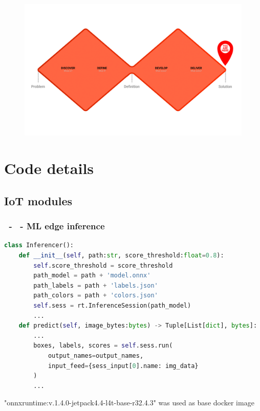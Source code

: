 \documentclass{beamer}
\makeatletter
\newcommand*{\currentname}{\@currentlabelname}
\makeatother
\begin{document}
\begin{frame}
\frametitle{\secname}
\begin{figure}
\includegraphics[width=0.9\linewidth]{Imagens/V1 D.jpg}
\end{figure}
\end{frame}


\section{Code details}
\begin{frame}
\centering \Huge {\currentname}
\end{frame}


\subsection{IoT modules}

\begin{frame}[fragile]
\frametitle{\secname\ - \subsecname\ - ML edge inference}
    \begin{lstlisting}[language=Python]
class Inferencer():
    def __init__(self, path:str, score_threshold:float=0.8):
        self.score_threshold = score_threshold
        path_model = path + 'model.onnx'
        path_labels = path + 'labels.json'
        path_colors = path + 'colors.json'
        self.sess = rt.InferenceSession(path_model)
        ...
    def predict(self, image_bytes:bytes) -> Tuple[List[dict], bytes]:
        ...
        boxes, labels, scores = self.sess.run(
            output_names=output_names,
            input_feed={sess_input[0].name: img_data}
        )
        ...\end{lstlisting}
    "onnxruntime:v.1.4.0-jetpack4.4-l4t-base-r32.4.3" was used as base docker image
\end{frame}
\end{document}
